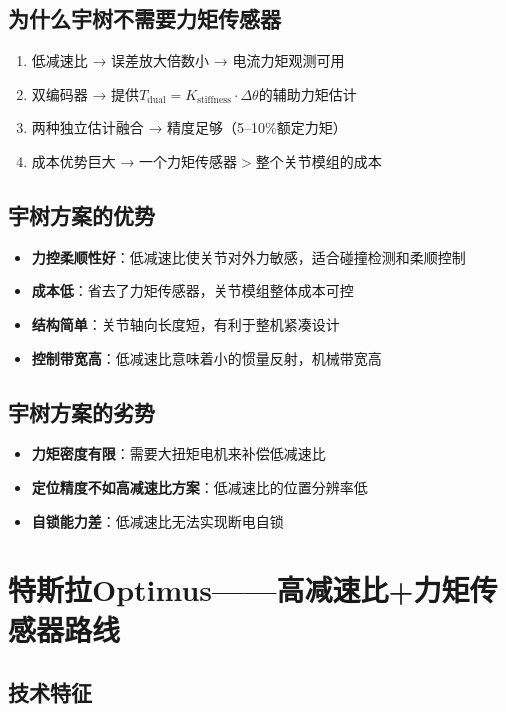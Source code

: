 \subsection{为什么宇树不需要力矩传感器}

\begin{enumerate}
  \item 低减速比 → 误差放大倍数小 → 电流力矩观测可用
  \item 双编码器 → 提供$T_{\text{dual}} = K_\text{stiffness} \cdot \Delta\theta$的辅助力矩估计
  \item 两种独立估计融合 → 精度足够（5--10\%额定力矩）
  \item 成本优势巨大 → 一个力矩传感器$>$整个关节模组的成本
\end{enumerate}

\subsection{宇树方案的优势}

\begin{itemize}
  \item \textbf{力控柔顺性好}：低减速比使关节对外力敏感，适合碰撞检测和柔顺控制
  \item \textbf{成本低}：省去了力矩传感器，关节模组整体成本可控
  \item \textbf{结构简单}：关节轴向长度短，有利于整机紧凑设计
  \item \textbf{控制带宽高}：低减速比意味着小的惯量反射，机械带宽高
\end{itemize}

\subsection{宇树方案的劣势}

\begin{itemize}
  \item \textbf{力矩密度有限}：需要大扭矩电机来补偿低减速比
  \item \textbf{定位精度不如高减速比方案}：低减速比的位置分辨率低
  \item \textbf{自锁能力差}：低减速比无法实现断电自锁
\end{itemize}

\section{特斯拉Optimus——高减速比+力矩传感器路线}

\subsection{技术特征}

